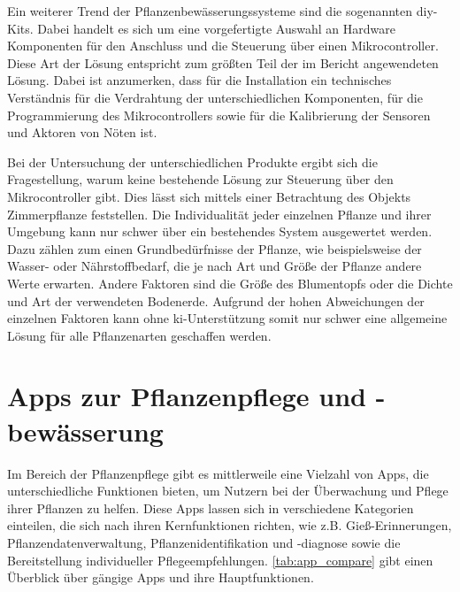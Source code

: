 Ein weiterer Trend der Pflanzenbewässerungssysteme sind die sogenannten \ac{diy}-Kits. Dabei handelt es sich um eine vorgefertigte Auswahl an Hardware Komponenten für den Anschluss und die Steuerung über einen Mikrocontroller. Diese Art der Lösung entspricht zum größten Teil der im Bericht angewendeten Lösung. Dabei ist anzumerken, dass für die Installation ein technisches Verständnis für die Verdrahtung der unterschiedlichen Komponenten, für die Programmierung des Mikrocontrollers sowie für die Kalibrierung der Sensoren und Aktoren von Nöten ist.

Bei der Untersuchung der unterschiedlichen Produkte ergibt sich die Fragestellung, warum keine bestehende Lösung zur Steuerung über den Mikrocontroller gibt. Dies lässt sich mittels einer Betrachtung des Objekts Zimmerpflanze feststellen. Die Individualität jeder einzelnen Pflanze und ihrer Umgebung kann nur schwer über ein bestehendes System ausgewertet werden. Dazu zählen zum einen Grundbedürfnisse der Pflanze, wie beispielsweise der Wasser- oder Nährstoffbedarf, die je nach Art und Größe der Pflanze andere Werte erwarten. Andere Faktoren sind die Größe des Blumentopfs oder die Dichte und Art der verwendeten Bodenerde. Aufgrund der hohen Abweichungen der einzelnen Faktoren kann ohne \ac{ki}-Unterstützung somit nur schwer eine allgemeine Lösung für alle Pflanzenarten geschaffen werden.


\section{Apps zur Pflanzenpflege und -bewässerung}

Im Bereich der Pflanzenpflege gibt es mittlerweile eine Vielzahl von Apps, die unterschiedliche Funktionen bieten, um Nutzern bei der Überwachung und Pflege ihrer Pflanzen zu helfen. Diese Apps lassen sich in verschiedene Kategorien einteilen, die sich nach ihren Kernfunktionen richten, wie z.B. Gieß-Erinnerungen, Pflanzendatenverwaltung, Pflanzenidentifikation und -diagnose sowie die Bereitstellung individueller Pflegeempfehlungen. \autoref{tab:app_compare} gibt einen Überblick über gängige Apps und ihre Hauptfunktionen.

